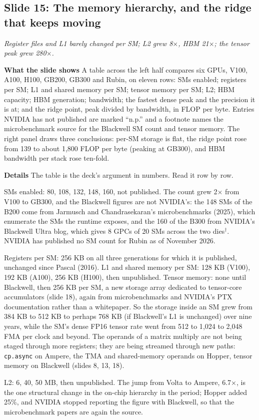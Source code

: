 \documentclass[11pt,letterpaper]{article}
\newcommand{\slide}[3]{%
  \subsection[Slide #1: #2]{Slide #1: #2}%
  {\color{muted}\itshape #3\par}\medskip}
\newcommand{\para}[1]{\medskip\noindent\textbf{#1}\quad}
\begin{document}
\slide{15}{The memory hierarchy, and the ridge that keeps moving}{Register files and L1 barely changed per SM; L2 grew 8$\times$, HBM 21$\times$; the tensor peak grew 280$\times$.}

\para{What the slide shows} A table across the left half compares six GPUs, V100, A100, H100, GB200, GB300 and Rubin, on eleven rows: SMs enabled; registers per SM; L1 and shared memory per SM; tensor memory per SM; L2; HBM capacity; HBM generation; bandwidth; the fastest dense peak and the precision it is at; and the ridge point, peak divided by bandwidth, in FLOP per byte. Entries NVIDIA has not published are marked ``n.p.'' and a footnote names the microbenchmark source for the Blackwell SM count and tensor memory. The right panel draws three conclusions: per-SM storage is flat, the ridge point rose from 139 to about 1{,}800 FLOP per byte (peaking at GB300), and HBM bandwidth per stack rose ten-fold.

\para{Details} The table is the deck's argument in numbers. Read it row by row.

SMs enabled: 80, 108, 132, 148, 160, not published. The count grew 2$\times$ from V100 to GB300, and the Blackwell figures are not NVIDIA's: the 148 SMs of the B200 come from Jarmusch and Chandrasekaran's microbenchmarks (2025), which enumerate the SMs the runtime exposes, and the 160 of the B300 from NVIDIA's Blackwell Ultra blog, which gives 8 GPCs of 20 SMs across the two dies$^\dagger$. NVIDIA has published no SM count for Rubin as of November 2026.

Registers per SM: 256 KB on all three generations for which it is published, unchanged since Pascal (2016). L1 and shared memory per SM: 128 KB (V100), 192 KB (A100), 256 KB (H100), then unpublished. Tensor memory: none until Blackwell, then 256 KB per SM, a new storage array dedicated to tensor-core accumulators (slide 18), again from microbenchmarks and NVIDIA's PTX documentation rather than a whitepaper. So the storage inside an SM grew from 384 KB to 512 KB to perhaps 768 KB (if Blackwell's L1 is unchanged) over nine years, while the SM's dense FP16 tensor rate went from 512 to 1{,}024 to 2{,}048 FMA per clock and beyond. The operands of a matrix multiply are not being staged through more registers; they are being streamed through new paths: \texttt{cp.async} on Ampere, the TMA and shared-memory operands on Hopper, tensor memory on Blackwell (slides 8, 13, 18).

L2: 6, 40, 50 MB, then unpublished. The jump from Volta to Ampere, 6.7$\times$, is the one structural change in the on-chip hierarchy in the period; Hopper added 25\%, and NVIDIA stopped reporting the figure with Blackwell, so that the microbenchmark papers are again the source.
\end{document}
